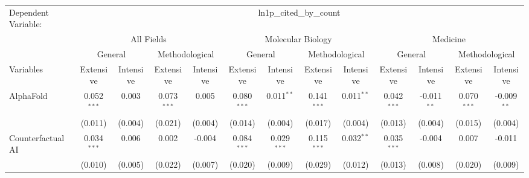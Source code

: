 \begingroup
\centering
\begin{tabular}{lcccccccccccc}
   \tabularnewline \midrule \midrule
   Dependent Variable: & \multicolumn{12}{c}{ln1p\_cited\_by\_count}\\
 & \multicolumn{4}{c}{All Fields} & \multicolumn{4}{c}{Molecular Biology} & \multicolumn{4}{c}{Medicine} \\
\cmidrule(lr){2-5} \cmidrule(lr){6-9} \cmidrule(lr){10-13}
 & \multicolumn{2}{c}{General} & \multicolumn{2}{c}{Methodological} & \multicolumn{2}{c}{General} & \multicolumn{2}{c}{Methodological} & \multicolumn{2}{c}{General} & \multicolumn{2}{c}{Methodological} \\
\cmidrule(lr){2-3} \cmidrule(lr){4-5} \cmidrule(lr){6-7} \cmidrule(lr){8-9} \cmidrule(lr){10-11} \cmidrule(lr){12-13}
Variables & \multicolumn{1}{c}{Extensive} & \multicolumn{1}{c}{Intensive} & \multicolumn{1}{c}{Extensive} & \multicolumn{1}{c}{Intensive} & \multicolumn{1}{c}{Extensive} & \multicolumn{1}{c}{Intensive} & \multicolumn{1}{c}{Extensive} & \multicolumn{1}{c}{Intensive} & \multicolumn{1}{c}{Extensive} & \multicolumn{1}{c}{Intensive} & \multicolumn{1}{c}{Extensive} & \multicolumn{1}{c}{Intensive} \\
\cmidrule(lr){1-1}\cmidrule(lr){2-2} \cmidrule(lr){3-3} \cmidrule(lr){4-4} \cmidrule(lr){5-5} \cmidrule(lr){6-6} \cmidrule(lr){7-7} \cmidrule(lr){8-8} \cmidrule(lr){9-9} \cmidrule(lr){10-10} \cmidrule(lr){11-11} \cmidrule(lr){12-12} \cmidrule(lr){13-13}
   AlphaFold                                & 0.052$^{***}$ & 0.003         & 0.073$^{***}$ & 0.005         & 0.080$^{***}$  & 0.011$^{**}$   & 0.141$^{***}$  & 0.011$^{**}$   & 0.042$^{***}$ & -0.011$^{**}$ & 0.070$^{***}$  & -0.009$^{**}$\\   
                                            & (0.011)       & (0.004)       & (0.021)       & (0.004)       & (0.014)        & (0.004)        & (0.017)        & (0.004)        & (0.013)       & (0.004)       & (0.015)        & (0.004)\\   
   Counterfactual AI                        & 0.034$^{***}$ & 0.006         & 0.002         & -0.004        & 0.084$^{***}$  & 0.029$^{***}$  & 0.115$^{***}$  & 0.032$^{**}$   & 0.035$^{***}$ & -0.004        & 0.007          & -0.011\\   
                                            & (0.010)       & (0.005)       & (0.022)       & (0.007)       & (0.020)        & (0.009)        & (0.029)        & (0.012)        & (0.013)       & (0.008)       & (0.020)        & (0.009)\\   

\end{tabular}
